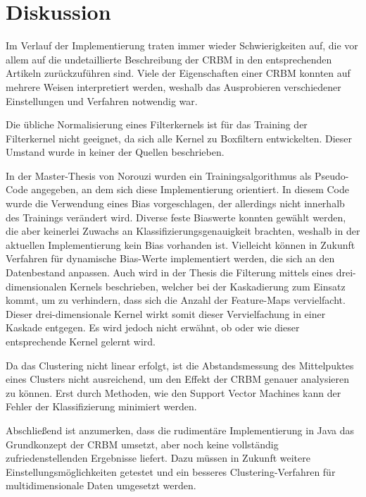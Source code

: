 \section{Diskussion}\label{discussion}
Im Verlauf der Implementierung traten immer wieder Schwierigkeiten auf, die vor allem auf die undetaillierte Beschreibung der CRBM in den entsprechenden Artikeln zurückzuführen sind. Viele der Eigenschaften einer CRBM konnten auf mehrere Weisen interpretiert werden, weshalb das Ausprobieren verschiedener Einstellungen und Verfahren notwendig war.

Die übliche Normalisierung eines Filterkernels ist für das Training der Filterkernel nicht geeignet, da sich alle Kernel zu Boxfiltern entwickelten. Dieser Umstand wurde in keiner der Quellen beschrieben.

In der Master-Thesis von Norouzi \cite{NorouziMaster} wurden ein Trainingsalgorithmus als Pseudo-Code angegeben, an dem sich diese Implementierung orientiert. In diesem Code wurde die Verwendung eines Bias vorgeschlagen, der allerdings nicht innerhalb des Trainings verändert wird. Diverse feste Biaswerte konnten gewählt werden, die aber keinerlei Zuwachs an Klassifizierungsgenauigkeit brachten, weshalb in der aktuellen Implementierung kein Bias vorhanden ist. Vielleicht können in Zukunft Verfahren für dynamische Bias-Werte implementiert werden, die sich an den Datenbestand anpassen.
Auch wird in der Thesis die Filterung mittels eines drei-dimensionalen Kernels beschrieben, welcher bei der Kaskadierung zum Einsatz kommt,  um zu verhindern, dass  sich die Anzahl der Feature-Maps vervielfacht. Dieser drei-dimensionale Kernel wirkt somit dieser Vervielfachung in einer Kaskade entgegen. Es wird jedoch nicht erwähnt, ob oder wie dieser entsprechende Kernel gelernt wird.

Da das Clustering nicht linear erfolgt, ist die Abstandsmessung des Mittelpuktes eines Clusters nicht ausreichend, um den Effekt der CRBM genauer analysieren zu können. Erst durch Methoden, wie den Support Vector Machines kann der Fehler der Klassifizierung minimiert werden.

Abschließend ist anzumerken, dass die rudimentäre Implementierung in Java das Grundkonzept der CRBM umsetzt, aber noch keine vollständig zufriedenstellenden Ergebnisse liefert. Dazu müssen in Zukunft weitere Einstellungsmöglichkeiten getestet und ein besseres Clustering-Verfahren für multidimensionale Daten umgesetzt werden.